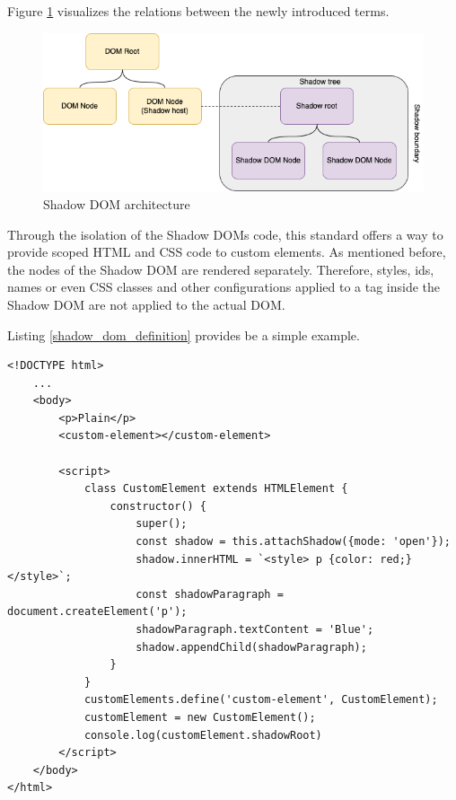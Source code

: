 Figure \ref{fig:shadow_dom} visualizes the relations between the newly introduced terms.

\begin{figure}[!h]
	\centering
	\includegraphics[width=1\textwidth]{Figures/shadow_dom.drawio.png}
	\caption{Shadow DOM architecture}
	\label{fig:shadow_dom}
\end{figure}

Through the isolation of the Shadow DOMs code, this standard offers a way to provide scoped HTML and CSS code to custom elements. As mentioned before, the nodes of the Shadow DOM are rendered separately. Therefore, styles, ids, names or even CSS classes and other configurations applied to a tag inside the Shadow DOM are not applied to the actual DOM.

Listing \ref{shadow_dom_definition} provides be a simple example.

\begin{lstlisting}[caption=Definition of a custom element using the Shadow DOM \cite{simon_thesis}, label=shadow_dom_definition]
<!DOCTYPE html> 
	...
	<body>
		<p>Plain</p> 
		<custom-element></custom-element>
		
		<script>
			class CustomElement extends HTMLElement {
				constructor() { 
					super();
					const shadow = this.attachShadow({mode: 'open'}); 
					shadow.innerHTML = `<style> p {color: red;} </style>`; 
					const shadowParagraph = document.createElement('p'); 
					shadowParagraph.textContent = 'Blue'; 
					shadow.appendChild(shadowParagraph);
				}
			}
			customElements.define('custom-element', CustomElement); 
			customElement = new CustomElement(); 
			console.log(customElement.shadowRoot)
		</script>
	</body>
</html>
\end{lstlisting}

